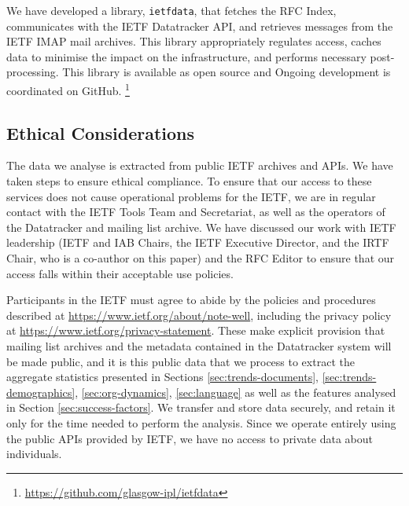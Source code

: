 \documentclass[twocolumn,10pt]{article}
\newcommand{\pb}[1]{\vspace{0.75ex}\noindent{\textbf{#1}}}
\begin{document}


\pb{Reproducibility and data access:}
We have developed a library, \texttt{ietfdata}, that fetches the RFC
Index, communicates with the IETF Datatracker API, and retrieves messages
from the IETF IMAP mail archives. This library appropriately regulates
access, caches data to minimise the impact on the infrastructure, and
performs necessary post-processing. This library is available as open
source and Ongoing development is coordinated on GitHub.%
\footnote{\url{https://github.com/glasgow-ipl/ietfdata}}


\subsection{Ethical Considerations}
\label{sec:ethics}


The data we analyse is extracted from public IETF archives and APIs.  We
have taken steps to ensure ethical compliance.  To ensure that our access
to these services does not cause operational problems for the IETF, we are
in regular contact with the IETF Tools Team and Secretariat, as well as the
operators of the Datatracker and mailing list archive.  We have
discussed our work with IETF leadership (IETF and IAB Chairs, the IETF
Executive Director, and the IRTF Chair, who is a co-author on this paper)
and the RFC Editor to ensure that our access falls within their acceptable
use policies.

Participants in the IETF must agree to abide by the policies and procedures
described at \url{https://www.ietf.org/about/note-well}, including the privacy
policy at \url{https://www.ietf.org/privacy-statement}. These make explicit
provision that mailing list archives and the metadata contained in the
Datatracker system will be made public, and it is this public data that
we process to extract the aggregate statistics presented in Sections
\ref{sec:trends-documents}, \ref{sec:trends-demographics}, \ref{sec:org-dynamics},
\ref{sec:language} as well as the features analysed in Section
\ref{sec:success-factors}. We transfer and store data securely, and retain
it only for the time needed to perform the analysis.  Since we operate
entirely using the public APIs provided by IETF, we have no access to
private data about individuals.
\end{document}
